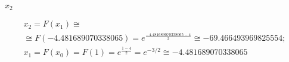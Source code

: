 \documentclass["CN_A-Tests_Resolutions.tex"]{subfiles}
\begin{document}
\begin{questionBox}
\begin{questionBox}
    \(x_2\)
    \begin{tcolorbox}
      \begin{gather}
        x_2 = F(x_1)
        \cong \\
        \cong F(\num{-4.481689070338065})
        = e^{\frac{\num{-4.481689070338065}-4}{2}}
        \cong
        \num{-69.466493969825554}
        ; \\
        x_1 = F(x_0)
        = F(1)
        = e^{\frac{1-4}{2}}
        = e^{-3/2}
        \cong \num{-4.481689070338065}
      \end{gather}
    \end{tcolorbox}
  \end{questionBox}



\end{questionBox}

\end{document}
